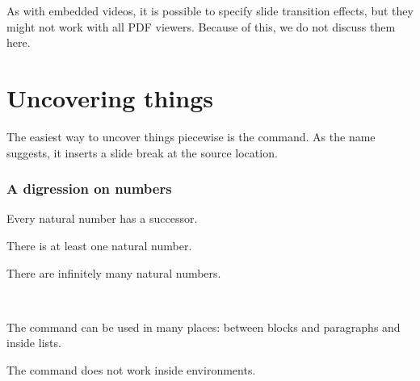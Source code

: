 \begin{technote}
As with embedded videos, it is possible to specify slide transition effects,
but they might not work with all PDF viewers.
Because of this, we do not discuss them here.
\end{technote}



%
%
\section{Uncovering things}

The easiest way to uncover things piecewise is the  command.
As the name suggests, it inserts a slide break at the source location.
%
\begin{ExampleCode}
\begin{frame}
\frametitle{A digression on numbers}

\begin{theorem}
Every natural number has a successor.
\end{theorem}

\pause

\begin{theorem}
There is at least one natural number.
\end{theorem}

\pause

\begin{corollary}
There are infinitely many natural numbers.
\end{corollary}
\end{frame}
\end{ExampleCode}
%
\begin{center}
~
~
\end{center}

The  command can be used in many places:
between blocks and paragraphs and inside lists.

\begin{gotcha}
The  command does not work inside  environments.
\end{gotcha}

